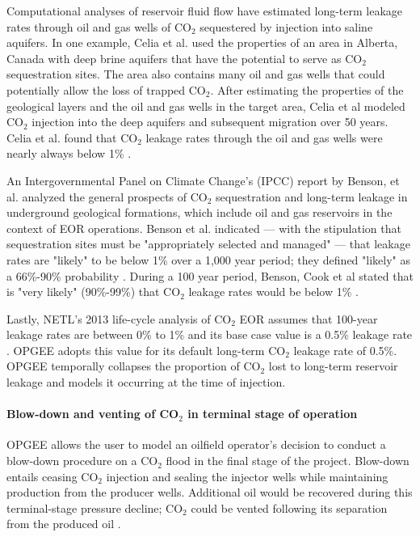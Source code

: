 \documentclass[11pt]{report}
\begin{document}
{Computational analyses of reservoir fluid flow have estimated long-term leakage rates through oil and gas wells of CO$_2$ sequestered by injection into saline aquifers. In one example, Celia et al. \cite{celia2011field} used the properties of an area in Alberta, Canada with deep brine aquifers that have the potential to serve as CO$_2$ sequestration sites. The area also contains many oil and gas wells that could potentially allow the loss of trapped CO$_2$. After estimating the properties of the geological layers and the oil and gas wells in the target area, Celia et al modeled CO$_2$ injection into the deep aquifers and subsequent migration over 50 years. Celia et al. found that CO$_2$ leakage rates through the oil and gas wells were nearly always below 1\%  \cite{celia2011field}.

An Intergovernmental Panel on Climate Change's (IPCC) report by Benson, et al. \cite{Benson2005} analyzed the general prospects of CO$_2$ sequestration and long-term leakage in underground geological formations, which include oil and gas reservoirs in the context of EOR operations. Benson et al. indicated --- with the stipulation that sequestration sites must be "appropriately selected and managed" --- that leakage rates are "likely" to be below 1\% over a 1,000 year period; they defined "likely" as a 66\%-90\% probability \cite{Benson2005}. During a 100 year period, Benson, Cook et al stated that is "very likely" (90\%-99\%) that CO$_2$ leakage rates would be below 1\% \cite{Benson2005}.

Lastly, NETL's 2013 life-cycle analysis of CO$_2$ EOR assumes that 100-year leakage rates are between 0\% to 1\% and its base case value is a 0.5\% leakage rate \cite{NETL2013}. OPGEE adopts this value for its default long-term CO$_2$ leakage rate of 0.5\%. OPGEE temporally collapses the proportion of CO$_2$ lost to long-term reservoir leakage and models it occurring at the time of injection.  

\paragraph{Blow-down and venting of CO$_2$ in terminal stage of operation} \label{par:Blowdown}
OPGEE allows the user to model an oilfield operator's decision to conduct a blow-down procedure on a CO$_2$ flood in the final stage of the project. Blow-down entails ceasing CO$_2$ injection and sealing the injector wells while maintaining production from the producer wells. Additional oil would be recovered during this terminal-stage pressure decline; CO$_2$ could be vented following its separation from the produced oil \cite{stevens1999sequestration}. 

}
\end{document}
